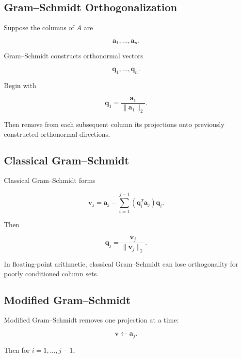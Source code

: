 \subsection{Gram--Schmidt Orthogonalization}
\label{subsec:gram-schmidt}

Suppose the columns of \(A\) are

\[
\mathbf{a}_1,\ldots,\mathbf{a}_n.
\]

Gram--Schmidt constructs orthonormal vectors

\[
\mathbf{q}_1,\ldots,\mathbf{q}_n.
\]

Begin with

\[
\boxed{
\mathbf{q}_1
=
\frac{
\mathbf{a}_1
}{
\|\mathbf{a}_1\|_2
}.
}
\]

Then remove from each subsequent column its projections onto previously
constructed orthonormal directions.

\subsection{Classical Gram--Schmidt}
\label{subsec:classical-gram-schmidt}

Classical Gram--Schmidt forms

\[
\boxed{
\mathbf{v}_j
=
\mathbf{a}_j
-
\sum_{i=1}^{j-1}
(
\mathbf{q}_i^T\mathbf{a}_j
)
\mathbf{q}_i.
}
\]

Then

\[
\boxed{
\mathbf{q}_j
=
\frac{
\mathbf{v}_j
}{
\|\mathbf{v}_j\|_2
}.
}
\]

In floating-point arithmetic, classical Gram--Schmidt can lose
orthogonality for poorly conditioned column sets.

\subsection{Modified Gram--Schmidt}
\label{subsec:modified-gram-schmidt}

Modified Gram--Schmidt removes one projection at a time:

\[
\mathbf{v}
\leftarrow
\mathbf{a}_j.
\]

Then for \(i=1,\ldots,j-1\),

